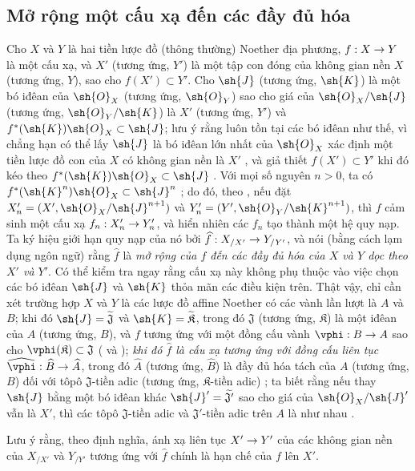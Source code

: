 \documentclass[oneside]{amsart}
\makeatletter
\newcommand{\ega@arrow}[2]{\mathchoice{#1}{#2}{#2}{#2}}
\renewcommand{\to}{\ega@arrow{\longrightarrow}{\rightarrow}}
\newcommand{\oldpage}[2][]{{\marginnote{\normalfont\textbf{#1}~|~#2}}\ignorespaces}
\let\EGAOriginalLabel\label
\renewcommand{\label}[1]{\phantomsection\EGAOriginalLabel{#1}}
\makeatother
\begin{document}
\subsection{Mở rộng một cấu xạ đến các đầy đủ hóa}
\label{subsection:I.10.9}

\begin{env}[10.9.1]
\label{I.10.9.1}
Cho $X$ và $Y$ là hai tiền lược đồ (thông thường) Noether địa phương, $f:X\to Y$ là một cấu xạ, và $X'$ (tương ứng, $Y'$) là một tập con đóng của không gian nền $X$ (tương ứng, $Y$), sao cho $f(X')\subset Y'$.
Cho $\sh{J}$ (tương ứng, $\sh{K}$) là một bó iđêan của $\sh{O}_X$ (tương ứng, $\sh{O}_Y$) sao cho giá của $\sh{O}_X/\sh{J}$ (tương ứng, $\sh{O}_Y/\sh{K}$) là $X'$ (tương ứng, $Y'$) và $f^*(\sh{K})\sh{O}_X\subset\sh{J}$; lưu ý rằng luôn tồn tại các bó iđêan như thế, vì chẳng hạn có thể lấy $\sh{J}$ là bó iđêan lớn nhất của $\sh{O}_X$ xác định một tiền lược đồ con của $X$ có không gian nền là $X'$ , và giả thiết $f(X')\subset Y'$ khi đó kéo theo $f^*(\sh{K})\sh{O}_X\subset\sh{J}$ .
Với mọi số nguyên $n>0$, ta có $f^*(\sh{K}^n)\sh{O}_X\subset\sh{J}^n$ ; do đó, theo , nếu đặt $X_n'=(X',\sh{O}_X/\sh{J}^{n+1})$ và $Y_n'=(Y',\sh{O}_Y/\sh{K}^{n+1})$, thì $f$ cảm sinh một cấu xạ $f_n:X_n'\to Y_n'$, và hiển nhiên các $f_n$ tạo thành một hệ quy nạp.
Ta ký hiệu giới hạn quy nạp của nó  bởi $\widehat{f}:X_{/X'}\to Y_{/Y'}$, và nói (bằng cách lạm dụng ngôn ngữ) rằng $\widehat{f}$ là \emph{mở rộng của $f$ đến các đầy đủ hóa của $X$ và $Y$ dọc theo $X'$ và $Y'$}.
Có thể kiểm tra ngay rằng cấu xạ này không phụ thuộc vào việc chọn các bó iđêan $\sh{J}$ và $\sh{K}$ thỏa mãn các điều kiện trên.
Thật vậy, chỉ cần xét trường hợp $X$ và $Y$ là các lược đồ affine Noether có các vành lần lượt là $A$ và $B$; khi đó $\sh{J}=\widetilde{\mathfrak{J}}$ và $\sh{K}=\widetilde{\mathfrak{K}}$, trong đó $\mathfrak{J}$ (tương ứng, $\mathfrak{K}$) là một iđêan của $A$ (tương ứng, $B$), và $f$ tương ứng với một đồng cấu vành $\vphi:B\to A$ sao cho $\vphi(\mathfrak{K})\subset\mathfrak{J}$ ( và ); \emph{khi đó $\widehat{f}$ là cấu xạ tương ứng  với đồng cấu liên tục $\widehat{\vphi}:\widehat{B}\to\widehat{A}$}, trong đó $\widehat{A}$ (tương ứng, $\widehat{B}$) là đầy đủ hóa tách của $A$ (tương ứng, $B$) đối với tôpô $\mathfrak{J}$-tiền adic (tương ứng, $\mathfrak{K}$-tiền adic) ; ta biết rằng nếu thay $\sh{J}$ bằng một
\oldpage[I]{199}
bó iđêan khác $\sh{J}'=\widetilde{\mathfrak{J}'}$ sao cho giá của $\sh{O}_X/\sh{J}'$ vẫn là $X'$, thì các tôpô $\mathfrak{J}$-tiền adic và $\mathfrak{J}'$-tiền adic trên $A$ là như nhau .

Lưu ý rằng, theo định nghĩa, ánh xạ liên tục $X'\to Y'$ của các không gian nền của $X_{/X'}$ và $Y_{/Y'}$ tương ứng với $\widehat{f}$ chính là hạn chế của $f$ lên $X'$.
\end{env}
\end{document}
